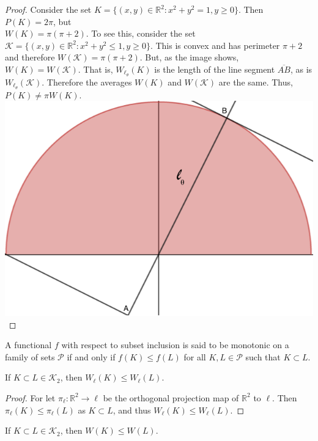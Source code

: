 \documentclass[crop=false,class=book,oneside]{standalone}
\begin{document}
            \begin{proof}
            Consider the set $K = \{(x,y) \in \mathbb{R}^2: x^2+y^2=1, y\geq 0\}$. Then $P(K) = 2\pi$, but \\ $W(K) = \pi(\pi+2)$. To see this, consider the set $\mathcal{K} = \{(x,y)\in \mathbb{R}^2: x^2 + y^2 \leq 1, y\geq 0\}$. This is convex and has perimeter $\pi+2$ and therefore $W(\mathcal{K}) = \pi(\pi+2)$. But, as the image shows, $W(K) = W(\mathcal{K})$. That is, $W_{\ell_{\theta}}(K)$ is the length of the line segment $\overline{AB}$, as is $W_{\ell_{\theta}}(\mathcal{K})$. Therefore the averages $W(K)$ and $W(\mathcal{K})$ are the same. Thus, $P(K) \ne \pi W(K)$.
            \includegraphics[scale=0.3]{semicircle-1.png}
            \end{proof}
            \begin{definition}
            A functional $f$ with respect to subset inclusion is said to be monotonic on a family of sets $\mathscr{P}$ if and only if $f(K)\leq f(L)$ for all $K,L \in \mathscr{P}$ such that $K\subset L$.
            \end{definition}
            \begin{theorem}
            If $K\subset L \in \mathscr{K}_2$, then $W_{\ell}(K) \leq W_{\ell}(L)$.
            \end{theorem}
            \begin{proof}
            For let $\pi_{\ell}:\mathbb{R}^2 \rightarrow \ell$ be the orthogonal projection map of $\mathbb{R}^2$ to $\ell$. Then $\pi_{\ell}(K)\leq \pi_{\ell}(L)$ as $K\subset L$, and thus $W_{\ell}(K)\leq W_{\ell}(L)$.
            \end{proof}
            \begin{theorem}
            If $K\subset L\in \mathscr{K}_2$, then $W(K)\leq W(L)$.
            \end{theorem}
\end{document}
